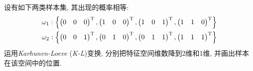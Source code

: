 \documentclass{article}
\begin{document}
\begin{homeworkProblem}
	设有如下两类样本集, 其出现的概率相等:
	\begin{align}
		\omega _1&: \left\{ \left( \begin{matrix}
			0&		0&		0\\
		\end{matrix} \right) ^{\mathrm{T}},\left( \begin{matrix}
			1&		0&		0\\
		\end{matrix} \right) ^{\mathrm{T}},\left( \begin{matrix}
			1&		0&		1\\
		\end{matrix} \right) ^{\mathrm{T}},\left( \begin{matrix}
			1&		1&		0\\
		\end{matrix} \right) ^{\mathrm{T}} \right\} \notag
		\\
		\omega _2&: \left\{ \left( \begin{matrix}
			0&		0&		1\\
		\end{matrix} \right) ^{\mathrm{T}},\left( \begin{matrix}
			0&		1&		0\\
		\end{matrix} \right) ^{\mathrm{T}},\left( \begin{matrix}
			0&		1&		1\\
		\end{matrix} \right) ^{\mathrm{T}},\left( \begin{matrix}
			1&		1&		1\\
		\end{matrix} \right) ^{\mathrm{T}} \right\} \notag
	\end{align}
	运用\textit{Karhunen-Loeve} (\textit{K-L})变换, 分别把特征空间维数降到2维和1维, 并画出样本在该空间中的位置.
	\\


\end{homeworkProblem}
\end{document}
